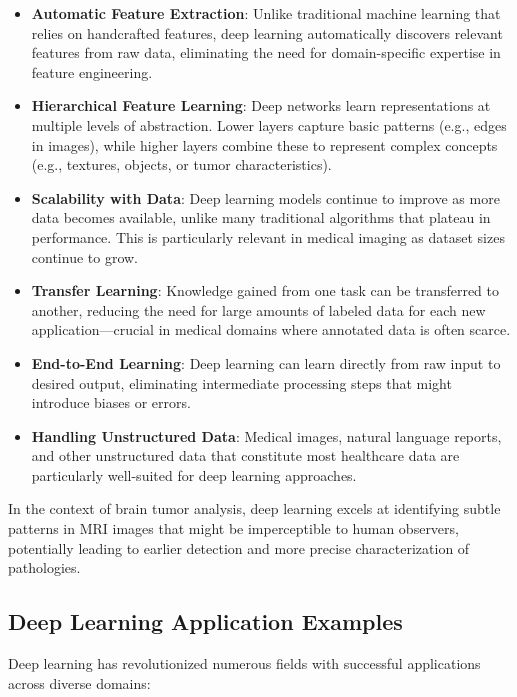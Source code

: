 \begin{itemize}
  \item \textbf{Automatic Feature Extraction}: Unlike traditional machine learning that relies on handcrafted features, deep learning automatically discovers relevant features from raw data, eliminating the need for domain-specific expertise in feature engineering.

  \item \textbf{Hierarchical Feature Learning}: Deep networks learn representations at multiple levels of abstraction. Lower layers capture basic patterns (e.g., edges in images), while higher layers combine these to represent complex concepts (e.g., textures, objects, or tumor characteristics).

  \item \textbf{Scalability with Data}: Deep learning models continue to improve as more data becomes available, unlike many traditional algorithms that plateau in performance. This is particularly relevant in medical imaging as dataset sizes continue to grow.

  \item \textbf{Transfer Learning}: Knowledge gained from one task can be transferred to another, reducing the need for large amounts of labeled data for each new application—crucial in medical domains where annotated data is often scarce.

  \item \textbf{End-to-End Learning}: Deep learning can learn directly from raw input to desired output, eliminating intermediate processing steps that might introduce biases or errors.

  \item \textbf{Handling Unstructured Data}: Medical images, natural language reports, and other unstructured data that constitute most healthcare data are particularly well-suited for deep learning approaches.
\end{itemize}

In the context of brain tumor analysis, deep learning excels at identifying subtle patterns in MRI images that might be imperceptible to human observers, potentially leading to earlier detection and more precise characterization of pathologies.

\subsection{Deep Learning Application Examples}
\label{sec:dl_applications}
Deep learning has revolutionized numerous fields with successful applications across diverse domains:


